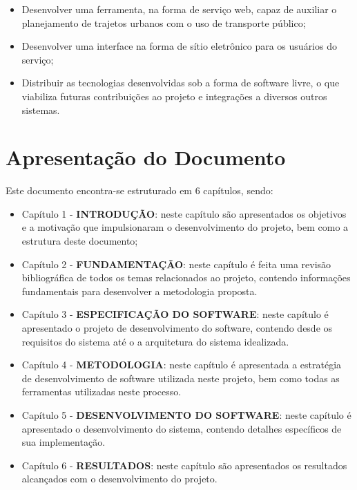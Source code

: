 
\begin{itemize}
	\item Desenvolver uma ferramenta, na forma de serviço web, capaz de auxiliar o planejamento de trajetos urbanos com o uso de transporte público;
	\item Desenvolver uma interface na forma de sítio eletrônico para os usuários do serviço;
	\item Distribuir as tecnologias desenvolvidas sob a forma de software livre, o que viabiliza futuras contribuições ao projeto e integrações a diversos outros sistemas.
\end{itemize}

\section{Apresentação do Documento}
Este documento encontra-se estruturado em 6 capítulos, sendo:

\begin{itemize}
	\item Capítulo 1 - \textbf{INTRODUÇÃO}: neste capítulo são apresentados os objetivos e a motivação que impulsionaram o desenvolvimento do projeto, bem como a estrutura deste documento;

	\item Capítulo 2 - \textbf{FUNDAMENTAÇÃO}: neste capítulo é feita uma revisão bibliográfica de todos os temas relacionados ao projeto, contendo informações fundamentais para desenvolver a metodologia proposta.

	\item Capítulo 3 - \textbf{ESPECIFICAÇÃO DO SOFTWARE}: neste capítulo é apresentado o projeto de desenvolvimento do software, contendo desde os requisitos do sistema até o a arquitetura do sistema idealizada.

	\item Capítulo 4 - \textbf{METODOLOGIA}: neste capítulo é apresentada a estratégia de desenvolvimento de software utilizada neste projeto, bem como todas as ferramentas utilizadas neste processo. 

	\item Capítulo 5 - \textbf{DESENVOLVIMENTO DO SOFTWARE}: neste capítulo é apresentado o desenvolvimento do sistema, contendo detalhes específicos de sua implementação.

	\item Capítulo 6 - \textbf{RESULTADOS}: neste capítulo são apresentados os resultados alcançados com o desenvolvimento do projeto.

\end{itemize}
